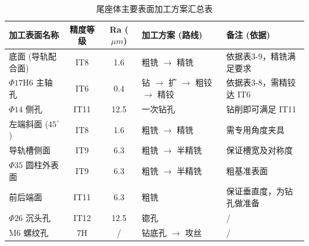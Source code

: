 \documentclass[withoutpreface,bwprint]{cumcmthesis}
\begin{document}
\begin{table}[H]
    \centering
    \caption{尾座体主要表面加工方案汇总表}
    \label{tab:process_scheme}
    \renewcommand{\arraystretch}{1.3} %
    \begin{tabular}{l c c l l}
        \toprule
        \textbf{加工表面名称} & \textbf{精度等级} & \textbf{Ra ($\mu m$)} & \textbf{加工方案 (路线)} & \textbf{备注 (依据)} \\
        \midrule
        底面 (导轨配合面) & IT8 & 1.6 & 粗铣 $\rightarrow$ 精铣 & 依据表3-9，精铣满足要求 \\
        $\Phi17$H6 主轴孔 & IT6 & 0.4 & 钻 $\rightarrow$ 扩 $\rightarrow$ 粗铰 $\rightarrow$ 精铰 & 依据表3-8，需精铰达 IT6 \\
        $\Phi14$ 侧孔 & IT11 & 12.5 & 一次钻孔 & 钻削即可满足 IT11 \\
        左端斜面 ($45^\circ$) & IT8 & 1.6 & 粗铣 $\rightarrow$ 精铣 & 需专用角度夹具 \\
        导轨槽侧面 & IT9 & 6.3 & 粗铣 $\rightarrow$ 半精铣 & 保证槽宽及对称度 \\
        $\Phi35$ 圆柱外表面 & IT9 & 6.3 & 粗铣 $\rightarrow$ 半精铣 & 粗基准表面 \\
        前后端面 & IT11 & 6.3 & 粗铣 & 保证垂直度，为钻孔做准备 \\
        $\Phi26$ 沉头孔 & IT12 & 12.5 & 锪孔 & / \\
        M6 螺纹孔 & 7H & / & 钻底孔 $\rightarrow$ 攻丝 & / \\
        \bottomrule
    \end{tabular}
\end{table}
\end{document}
